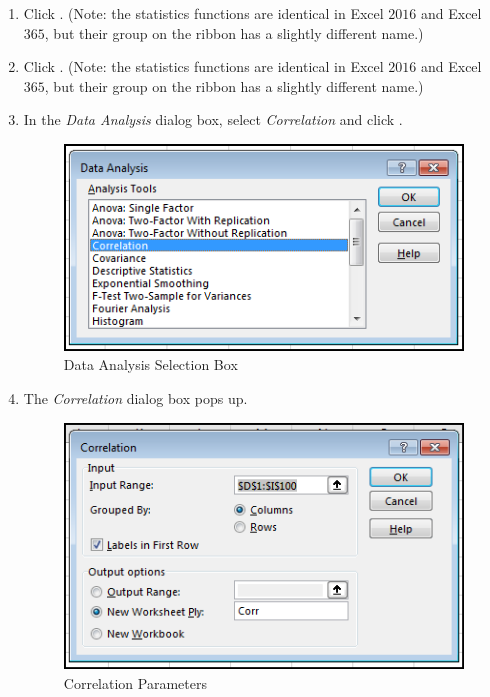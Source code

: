 \begin{enumbox}
	\begin{enumerate}
		\item {} Click . (Note: the statistics functions are identical in Excel $ 2016 $ and Excel $ 365 $, but their group on the ribbon has a slightly different name.)
		\item {} Click . (Note: the statistics functions are identical in Excel $ 2016 $ and Excel $ 365 $, but their group on the ribbon has a slightly different name.)
		\item In the \textit{Data Analysis} dialog box, select \textit{Correlation} and click .

		\begin{figure}[H]
			\centering
			\includegraphics[width=\maxwidth{.95\linewidth}]{gfx/ch09_fig54}
			\caption{Data Analysis Selection Box}
			\label{09:fig54}
		\end{figure}

		\item The \textit{Correlation} dialog box pops up.

		\begin{figure}[H]
			\centering
			\includegraphics[width=\maxwidth{.75\linewidth}]{gfx/ch09_fig55}
			\caption{Correlation Parameters}
			\label{09:fig55}
		\end{figure}


\end{enumerate}
\end{enumbox}
